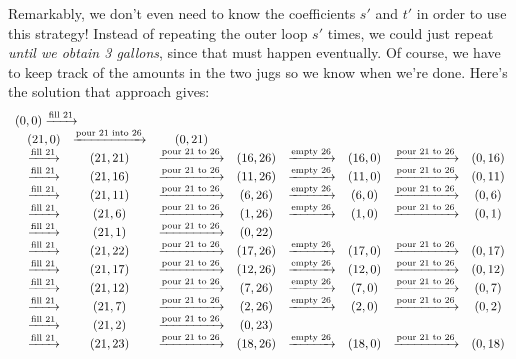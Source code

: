 Remarkably, we don't even need to know the coefficients $s'$ and $t'$
in order to use this strategy!  Instead of repeating the outer loop
$s'$ times, we could just repeat \emph{until we obtain 3 gallons},
since that must happen eventually.  Of course, we have to keep track
of the amounts in the two jugs so we know when we're done.  Here's the
solution that approach gives:
\[
\begin{array}{ccccccccc}
\lefteqn{(0,0)  \xrightarrow{\text{fill 21}}}\\
& (21,0)& \xrightarrow{\text{pour 21 into 26}} & (0,21)\\
& \xrightarrow{\text{fill 21}} & (21,21)& \xrightarrow{\text{pour 21 to 26}} & (16,26)& \xrightarrow{\text{empty 26}} & (16,0)& \xrightarrow{\text{pour 21 to 26}} & (0,16)\\
& \xrightarrow{\text{fill 21}} & (21,16)& \xrightarrow{\text{pour 21 to 26}} & (11,26)& \xrightarrow{\text{empty 26}} & (11,0)& \xrightarrow{\text{pour 21 to 26}} & (0,11)\\
& \xrightarrow{\text{fill 21}} & (21,11)& \xrightarrow{\text{pour 21 to 26}} & (6,26)& \xrightarrow{\text{empty 26}} & (6,0)& \xrightarrow{\text{pour 21 to 26}} & (0,6)\\
& \xrightarrow{\text{fill 21}} & (21,6)& \xrightarrow{\text{pour 21 to 26}} & (1,26)& \xrightarrow{\text{empty 26}} & (1,0)& \xrightarrow{\text{pour 21 to 26}} & (0,1)\\
& \xrightarrow{\text{fill 21}} & (21,1)& \xrightarrow{\text{pour 21 to 26}} & (0,22)\\
& \xrightarrow{\text{fill 21}} & (21,22)& \xrightarrow{\text{pour 21 to 26}} & (17,26)& \xrightarrow{\text{empty 26}} & (17,0)& \xrightarrow{\text{pour 21 to 26}} & (0,17)\\
& \xrightarrow{\text{fill 21}} & (21,17)& \xrightarrow{\text{pour 21 to 26}} & (12,26)& \xrightarrow{\text{empty 26}} & (12,0)& \xrightarrow{\text{pour 21 to 26}} & (0,12)\\
& \xrightarrow{\text{fill 21}} & (21,12)& \xrightarrow{\text{pour 21 to 26}} & (7,26)& \xrightarrow{\text{empty 26}} & (7,0)& \xrightarrow{\text{pour 21 to 26}} & (0,7)\\
& \xrightarrow{\text{fill 21}} & (21,7)& \xrightarrow{\text{pour 21 to 26}} & (2,26)& \xrightarrow{\text{empty 26}} & (2,0)& \xrightarrow{\text{pour 21 to 26}} & (0,2)\\
& \xrightarrow{\text{fill 21}} & (21,2)& \xrightarrow{\text{pour 21 to 26}} & (0,23)\\
& \xrightarrow{\text{fill 21}} & (21,23)& \xrightarrow{\text{pour 21 to 26}} & (18,26)& \xrightarrow{\text{empty 26}} & (18,0)& \xrightarrow{\text{pour 21 to 26}} & (0,18)\\

\end{array}\]
